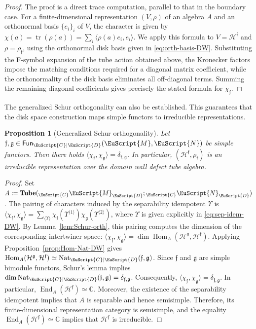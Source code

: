 \documentclass[a4paper,11pt]{article}
\newtheorem{proposition}[theorem]{Proposition}
\theoremstyle{definition}
\theoremstyle{remark}
\newcommand\eC           {\EuScript{C}}
\newcommand\eD           {\EuScript{D}}
\newcommand\eM          {\EuScript{M}}
\newcommand\eN         {\EuScript{N}}
\newcommand{\Hom}{\operatorname{Hom}}
\newcommand{\End}{\operatorname{End}}
\newcommand{\Tube}{\mathbf{Tube}}
\newcommand{\Fun}{\mathsf{Fun}}
\begin{document}
\begin{proof}
    The proof is a direct trace computation, parallel to that in the boundary case. For a finite-dimensional representation $(V,\rho)$ of an algebra $A$ and an orthonormal basis $\{e_i\}_{i}$ of $V$, the character is given by $\chi(a) = \operatorname{tr}(\rho(a)) = \sum_{i} \langle \rho(a)e_i,e_i\rangle$. 
    We apply this formula to $V=\mathcal H^{\mathfrak f}$ and $\rho=\rho_{\mathfrak f}$, using the orthonormal disk basis given in \eqref{eq:orth-basis-DW}. Substituting the F-symbol expansion of the tube action obtained above, the Kronecker factors impose the matching conditions required for a diagonal matrix coefficient, while the orthonormality of the disk basis eliminates all off-diagonal terms. Summing the remaining diagonal coefficients gives precisely the stated formula for $\chi_{\mathfrak f}$.
\end{proof}

The generalized Schur orthogonality can also be established. This guarantees that the disk space construction maps simple functors to irreducible representations. 

\begin{proposition}[Generalized Schur orthogonality] \label{prop:Schur-orth-DW}
    Let $\mathfrak{f}, \mathfrak{g}\in \Fun_{\eC|\eD}(\eM,\eN)$ be simple functors. Then there holds $\langle\chi_\mathfrak{f},\chi_\mathfrak{g}\rangle =\delta_{\mathfrak{f},\mathfrak{g}}$. In particular, $(\mathcal{H}^{\mathfrak{f}},\rho_\mathfrak{f})$ is an irreducible representation over the domain wall defect tube algebra. 
\end{proposition}

\begin{proof}
    Set $A:=\Tube({}_\eC\eM_\eD;{}_\eC\eN_\eD)$. The pairing of characters induced by the separability idempotent $\Upsilon$ is $\langle \chi_\mathfrak{f},\chi_\mathfrak{g}\rangle = \sum_{\langle \Upsilon \rangle} \chi_\mathfrak{f}(\Upsilon^{\langle 1 \rangle})\chi_\mathfrak{g}(\Upsilon^{\langle 2 \rangle})$, where $\Upsilon$ is given explicitly in \eqref{eq:sep-idem-DW}. By Lemma~\ref{lem:Schur-orth}, this pairing computes the dimension of the corresponding intertwiner space: $\langle\chi_{\mathfrak f},\chi_{\mathfrak g}\rangle =\dim\Hom_A(\mathcal H^{\mathfrak g},\mathcal H^{\mathfrak f})$. Applying Proposition~\ref{prop:Hom-Nat-DW} gives $\Hom_A(\mathcal H^{\mathfrak g},\mathcal H^{\mathfrak f})\simeq\operatorname{Nat}_{\eC|\eD}(\mathfrak f,\mathfrak g)$. Since $\mathfrak f$ and $\mathfrak g$ are simple bimodule functors, Schur's lemma implies $\dim\operatorname{Nat}_{\eC|\eD}(\mathfrak f,\mathfrak g) = \delta_{\mathfrak f,\mathfrak g}$. Consequently, $\langle\chi_{\mathfrak f},\chi_{\mathfrak g}\rangle = \delta_{\mathfrak f,\mathfrak g}$.  In particular, $\End_A(\mathcal H^{\mathfrak f})\simeq\mathbb{C}$. Moreover, the existence of the separability idempotent implies that $A$ is separable and hence semisimple. Therefore, its finite-dimensional representation category is semisimple, and the equality $\End_A(\mathcal H^{\mathfrak f})\simeq\mathbb C$ implies that $\mathcal H^{\mathfrak f}$ is irreducible.
\end{proof}
\end{document}
